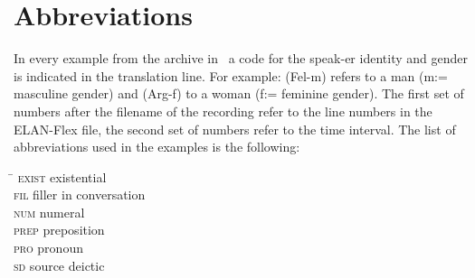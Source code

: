 \documentclass[output=paper
,modfonts
,nonflat]{langsci/langscibook}
\begin{document}
\section*{Abbreviations}\label{sec:abbrev}
In every example from the archive in~\citet{Delgado-Galvan2018archive} a code for the speak\hyp{}er identity and gender is indicated in the translation line. For example: (Fel-m) refers to a man (m:= masculine gender) and (Arg-f) to a woman (f:= feminine gender). The first set of numbers after the filename of the recording refer to the line numbers in the ELAN-Flex file, the second set of numbers refer to the time interval. The list of abbreviations used in the examples is the following:

\begin{multicols}{2}
	\begin{tabbing}
		\hspace{3em} \= \kill
		\textsc{exist} \> existential \\
		\textsc{fil} \> filler in conversation\\ 
		\textsc{num} \> numeral\\ 
		\textsc{prep} \> preposition\\
		\textsc{pro} \> pronoun\\
		\textsc{sd} \> source deictic\\
	\end{tabbing}
\end{multicols}

{\sloppy
	\printbibliography[heading=subbibliography,notkeyword=this]
}
\end{document}
